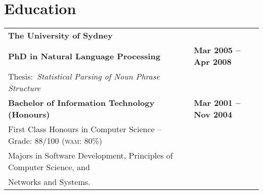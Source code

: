 \documentclass[]{article}
\begin{document}
\newpage


\section*{Education}

\setlength{\tabcolsep}{0.1cm}
\begin{table*}[h!]
\begin{tabular}[h!]{p{12.7cm}l}

\textbf{The University of Sydney} & \\
\textbf{PhD in Natural Language Processing} & \textbf{Mar 2005 -- Apr 2008}\\
\hspace{0.5cm}Thesis:~\textit{Statistical Parsing of Noun Phrase Structure} & \\

\textbf{Bachelor of Information Technology (Honours)} & \textbf{Mar 2001 -- Nov 2004}\\
\hspace{0.5cm}First Class Honours in Computer Science -- Grade: 88/100 (\textsc{wam}: 80\%) & \\
\hspace{0.5cm}Majors in Software Development, Principles of Computer Science, and & \\
\hspace{0.5cm}Networks and Systems. & \\


\end{tabular}
\end{table*}
\end{document}
